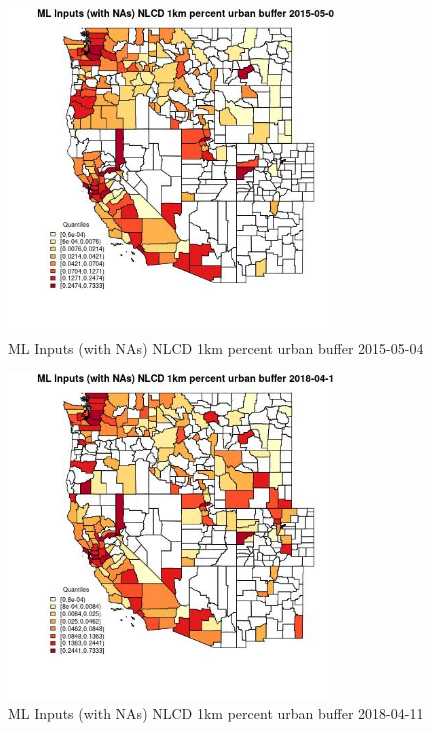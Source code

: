 \begin{figure} 
\centering  
\includegraphics[width=0.77\textwidth]{Code_Outputs/Report_ML_input_PM25_Step4_part_e_de_duplicated_aves_compiled_2019-05-18wNAs_CountyNLCD_1km_percent_urban_bufferMean2015-05-04_2015-05-04.jpg} 
\caption{\label{fig:Report_ML_input_PM25_Step4_part_e_de_duplicated_aves_compiled_2019-05-18wNAsCountyNLCD_1km_percent_urban_bufferMean2015-05-04_2015-05-04}ML Inputs (with NAs) NLCD 1km percent urban buffer 2015-05-04} 
\end{figure} 
 

\begin{figure} 
\centering  
\includegraphics[width=0.77\textwidth]{Code_Outputs/Report_ML_input_PM25_Step4_part_e_de_duplicated_aves_compiled_2019-05-18wNAs_CountyNLCD_1km_percent_urban_bufferMean2018-04-11_2018-04-11.jpg} 
\caption{\label{fig:Report_ML_input_PM25_Step4_part_e_de_duplicated_aves_compiled_2019-05-18wNAsCountyNLCD_1km_percent_urban_bufferMean2018-04-11_2018-04-11}ML Inputs (with NAs) NLCD 1km percent urban buffer 2018-04-11} 
\end{figure} 
 

